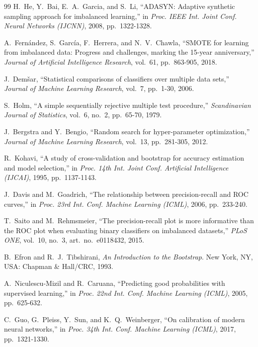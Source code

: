 \documentclass[conference]{IEEEtran}
\begin{document}
\begin{thebibliography}{99}
H.~He, Y.~Bai, E.~A.~Garcia, and S.~Li, ``ADASYN: Adaptive synthetic
sampling approach for imbalanced learning,'' in \emph{Proc. IEEE Int. Joint
Conf. Neural Networks (IJCNN)}, 2008, pp.~1322-1328.

A.~Fern\'andez, S.~Garc\'ia, F.~Herrera, and N.~V.~Chawla, ``SMOTE for
learning from imbalanced data: Progress and challenges, marking the 15-year
anniversary,'' \emph{Journal of Artificial Intelligence Research}, vol.~61,
pp.~863-905, 2018.

J.~Dem\v{s}ar, ``Statistical comparisons of classifiers over multiple data
sets,'' \emph{Journal of Machine Learning Research}, vol.~7, pp.~1-30, 2006.

S.~Holm, ``A simple sequentially rejective multiple test procedure,''
\emph{Scandinavian Journal of Statistics}, vol.~6, no.~2, pp.~65-70, 1979.

J.~Bergstra and Y.~Bengio, ``Random search for hyper-parameter
optimization,'' \emph{Journal of Machine Learning Research}, vol.~13,
pp.~281-305, 2012.

R.~Kohavi, ``A study of cross-validation and bootstrap for accuracy
estimation and model selection,'' in \emph{Proc. 14th Int. Joint Conf.
Artificial Intelligence (IJCAI)}, 1995, pp.~1137-1143.

J.~Davis and M.~Goadrich, ``The relationship between precision-recall and
ROC curves,'' in \emph{Proc. 23rd Int. Conf. Machine Learning (ICML)}, 2006,
pp.~233-240.

T.~Saito and M.~Rehmsmeier, ``The precision-recall plot is more informative
than the ROC plot when evaluating binary classifiers on imbalanced
datasets,'' \emph{PLoS ONE}, vol.~10, no.~3, art.~no.~e0118432, 2015.

B.~Efron and R.~J.~Tibshirani, \emph{An Introduction to the Bootstrap}.
New York, NY, USA: Chapman \& Hall/CRC, 1993.

A.~Niculescu-Mizil and R.~Caruana, ``Predicting good probabilities with
supervised learning,'' in \emph{Proc. 22nd Int. Conf. Machine Learning
(ICML)}, 2005, pp.~625-632.

C.~Guo, G.~Pleiss, Y.~Sun, and K.~Q.~Weinberger, ``On calibration of modern
neural networks,'' in \emph{Proc. 34th Int. Conf. Machine Learning (ICML)},
2017, pp.~1321-1330.


\end{thebibliography}
\end{document}
